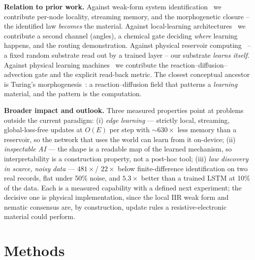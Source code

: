 \documentclass[conference]{IEEEtran}
\begin{document}
\textbf{Relation to prior work.} Against weak-form system
identification~\cite{WSINDy21,OWSINDy22} we contribute per-node locality, streaming
memory, and the morphogenetic closure -- the identified law \emph{becomes} the
material. Against local-learning
architectures~\cite{EP17,DNI17,RB99,FF22,KH19} we contribute a second channel (angles),
a chemical gate deciding \emph{where} learning happens, and the routing demonstration.
Against physical reservoir computing~\cite{Tanaka19,Jaeger01,Maass02} -- a fixed random
substrate read out by a trained layer -- our substrate \emph{learns itself}. Against
physical learning machines~\cite{Stern21,MN24} we contribute the
reaction--diffusion--advection gate and the explicit read-back metric. The closest
conceptual ancestor is Turing's morphogenesis~\cite{Turing52}: a reaction--diffusion
field that patterns a \emph{learning} material, and the pattern is the computation.

\textbf{Broader impact and outlook.} Three measured properties point at problems
outside the current paradigm: (i) \emph{edge learning} --- strictly local, streaming,
global-loss-free updates at $O(E)$ per step with ${\sim}630\times$ less memory than a
reservoir, so the network that uses the world can learn from it on-device; (ii)
\emph{inspectable AI} --- the shape is a readable map of the learned mechanism, so
interpretability is a construction property, not a post-hoc tool; (iii) \emph{law
discovery in scarce, noisy data} --- $481\times$/ $22\times$ below finite-difference
identification on two real records, flat under 50\% noise, and $5.3\times$ better
than a trained LSTM at 10\% of the data. Each is a measured capability with a defined
next experiment; the decisive one is physical implementation, since the local IIR
weak form and nematic consensus are, by construction, update rules a
resistive-electronic material could perform.

\section{Methods}
\end{document}
